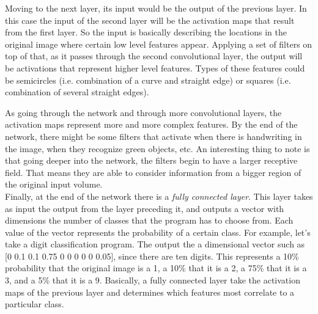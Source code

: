 \documentclass[12pt,a4paper]{report}
\newcommand{\term}{\textit}
\begin{document}
	Moving to the next layer, its input would be the output of the previous layer. 
	In this case the input of the second layer will be the activation maps that result 
	from the first layer. So the input is basically describing the locations in the 
	original image where certain low level features appear. Applying a set of filters 
	on top of that, as it passes through the second convolutional layer, the output 
	will be activations that represent higher level features. Types of these features 
	could be semicircles (i.e. combination of a curve and straight edge) or squares 
	(i.e. combination of several straight edges).
	\par
	As going through the network and through more convolutional layers, the activation 
	maps represent more and more complex features. By the end of the network, there 
	might be some filters that activate when there is handwriting in the image, when 
	they recognize green objects, etc. An interesting thing to note is that going deeper 
	into the network, the filters begin to have a larger receptive field. That means 
	they are able to consider information from a bigger region of the original input 
	volume.
	\\
	
	Finally, at the end of the network there is a \term{fully connected layer}. This 
	layer takes as input the output from the layer preceding it, and outputs a vector 
	with dimensions the number of classes that the program has to choose from. Each 
	value of the vector represents the probability of a certain class.	For example, 
	let's take a digit classification program. The output the a dimensional vector 
	such as [0 0.1 0.1 0.75 0 0 0 0 0 0.05], since there are ten digits. This represents 
	a 10\% probability that the original image is a 1, a 10\% that it is a 2, a 75\% 
	that it is a 3, and a 5\% that it is a 9. Basically, a fully connected layer take 
	the activation maps of the previous layer and determines which features most 
	correlate to a particular class.
	\\
	
	
	\renewcommand{\bibname}{References}
	
	
\end{document}
